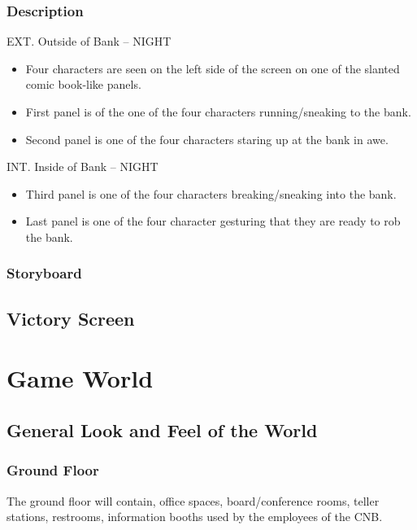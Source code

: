 \documentclass[14pt]{report}
\begin{document}
\subsubsection{Description}

EXT. Outside of Bank -- NIGHT
\begin{itemize}
    \item Four characters are seen on the left side of the screen on one of the slanted comic book-like panels. 
    \item First panel is of the one of the four characters running/sneaking to the bank.
    \item Second panel is one of the four characters staring up at the bank in awe.
\end{itemize}
INT. Inside of Bank -- NIGHT
\begin{itemize}
    \item Third panel is one of the four characters breaking/sneaking into the bank.
    \item Last panel is one of the four character gesturing that they are ready to rob the bank.
\end{itemize}

\subsubsection{Storyboard}

\subsection{Victory Screen}

\section{Game World}

\subsection{General Look and Feel of the World}

\subsubsection{Ground Floor}

The ground floor will contain, office spaces, board/conference rooms, teller stations, restrooms, information booths used by the employees of the CNB.
\end{document}
